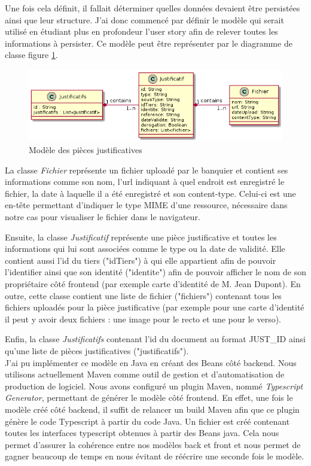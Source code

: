 	Une fois cela définit, il fallait déterminer quelles données devaient être persistées ainsi que leur structure. J'ai donc commencé par définir le modèle qui serait utilisé en étudiant plus en profondeur l'user story afin de relever toutes les informations à persister. Ce modèle peut être représenter par le diagramme de classe figure \ref{modelePJ}.	
	
\begin{figure}[h!]
	\includegraphics[scale=0.7]{images/travailBP1818/piecesJustif/modelePJ.png}
	\centering
	\caption{Modèle des pièces justificatives}
	\label{modelePJ}
\end{figure}

	La classe \textit{Fichier} représente un fichier uploadé par le banquier et contient ses informations comme son nom, l'url indiquant à quel endroit est enregistré le fichier, la date à laquelle il a été enregistré et son content-type. Celui-ci est une en-tête permettant d'indiquer le type MIME d'une ressource, nécessaire dans notre cas pour visualiser le fichier dans le navigateur.
	
	Ensuite, la classe \textit{Justificatif} représente une pièce justificative et toutes les informations qui lui sont associées comme le type ou la date de validité. Elle contient aussi l'id du tiers ("idTiers") à qui elle appartient afin de pouvoir l'identifier ainsi que son identité ("identite") afin de pouvoir afficher le nom de son propriétaire côté frontend (par exemple carte d'identité de M. Jean Dupont). En outre, cette classe contient une liste de fichier ("fichiers") contenant tous les fichiers uploadés pour la pièce justificative (par exemple pour une carte d'identité il peut y avoir deux fichiers : une image pour le recto et une pour le verso).
	
	Enfin, la classe \textit{Justificatifs} contenant l'id du document au format JUST\_ID ainsi qu'une liste de pièces justificatives ("justificatifs"). \\
	
	J'ai pu implémenter ce modèle en Java en créant des Beans côté backend. Nous utilisons actuellement Maven comme outil de gestion et d'automatisation de production de logiciel. Nous avons configuré un plugin Maven, nommé \textit{Typescript Generator}, permettant de générer le modèle côté frontend. En effet, une fois le modèle créé côté backend, il suffit de relancer un build Maven afin que ce plugin génère le code Typescript à partir du code Java. Un fichier est créé contenant toutes les interfaces typescript obtenues à partir des Beans java. Cela nous permet d'assurer la cohérence entre nos modèles back et front et nous permet de gagner beaucoup de temps en nous évitant de réécrire une seconde fois le modèle.
	  
